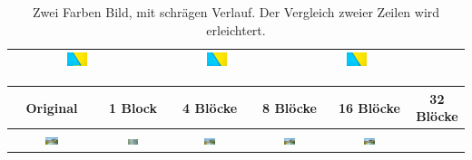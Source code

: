 \begin{landscape}
\begin{table}[h!]
\begin{tabular}{|c|c|c|c|c|c|}
    \includegraphics[width=0.16\textwidth]{./img/decipher/08_test.png}& 
    \includegraphics[width=0.16\textwidth]{./img/decipher/16_test.png}& 
    \includegraphics[width=0.16\textwidth]{./img/decipher/32_test.png}\\
    \hline
    \end{tabular}
    \caption{Zwei Farben Bild, mit schrägen Verlauf. Der Vergleich zweier Zeilen wird erleichtert.}
\end{table}
\begin{table}[h!]
    \begin{tabular}{|c|c|c|c|c|c|}
    \hline
    \textbf{Original} & \textbf{1 Block} & \textbf{4 Blöcke} & \textbf{8 Blöcke} & \textbf{16 Blöcke} & \textbf{32 Blöcke} \\
    \hline
    \includegraphics[width=0.16\textwidth]{./img/salzburg.png}& 
    \includegraphics[width=0.16\textwidth]{./img/cipher/01_salzburg.png}& 
    \includegraphics[width=0.16\textwidth]{./img/cipher/04_salzburg.png}& 
    \includegraphics[width=0.16\textwidth]{./img/cipher/08_salzburg.png}& 
    \includegraphics[width=0.16\textwidth]{./img/cipher/16_salzburg.png}& 

\end{tabular}
\end{table}
\end{landscape}

